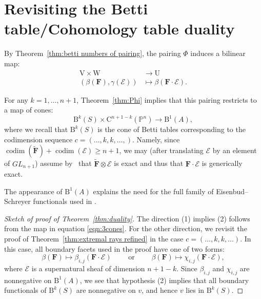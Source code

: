 \documentclass[12pt]{amsart}
\theoremstyle{definition}
\theoremstyle{remark}
\newcommand{\codim}{\operatorname{codim}}
\newcommand{\PP}{\mathbb{P}}
\newcommand{\UU}{\mathrm{U}}
\newcommand{\VV}{\mathrm{V}}
\newcommand{\WW}{\mathrm{W}}
\newcommand{\cc}{c}
\newcommand{\cE}{\mathcal{E}}
\newcommand{\FF}{\mathbf{F}}
\newcommand{\GL}{{GL}}
\newcommand{\CQ}{\mathrm{C}}
\newcommand{\BBQ}{\mathrm{B}}
\begin{document}
\section{Revisiting the Betti table/Cohomology table duality}\label{sec:duality}


By Theorem~\ref{thm:betti numbers of pairing}, the pairing $\Phi$ induces a bilinear map:
\begin{align*}
\VV\times \WW & \to \UU\\
(\beta(\FF),\gamma(\cE))&\mapsto \beta(\FF\cdot \cE).
\end{align*}


For any $k=1, \dots, n+1$, Theorem~\ref{thm:Phi}  implies that this pairing  restricts to a map of cones:
\begin{equation}\label{eqn:3cones}
\BBQ^{k}(S)\times \CQ^{n+1-k}(\PP^n)\to \BBQ^1(A),
\end{equation}
where we recall that $\BBQ^k(S)$ is the cone of Betti tables corresponding to the codimension sequence $\cc=(\dots,k,k,\dots,)$.
Namely, since $\codim(\widetilde{\FF})+\codim(\cE)\geq n+1$, we may (after translating $\cE$ by an element of $\GL_{n+1}$) assume by~\cite[Theorem, p. 335]{miller-speyer} that $\widetilde{\FF}\otimes \cE$ is exact and thus that $\FF\cdot \cE$ is generically exact.

The 
 appearance of $\BBQ^1(A)$ explains the need for the full family of Eisenbud--Schreyer functionals used in \cite{eis-schrey1}.
\begin{proof}[Sketch of proof of Theorem~\ref{thm:duality}]
The direction (1) implies (2) follows from the map in equation \eqref{eqn:3cones}. For the other direction, we revisit the proof of Theorem~\ref{thm:extremal rays refined} in the case $\cc=(\dots, k,k,\dots)$.  In this case, all boundary facets used in the proof have one of two forms:
\[
\beta(\FF)\mapsto\beta_{i,j}(\FF\cdot \cE) \qquad \text{ or } \qquad \beta(\FF)\mapsto\chi_{i,j}(\FF\cdot \cE),
\]
where $\cE$ is a supernatural sheaf of dimension $n+1-k$.  Since $\beta_{i,j}$ and $\chi_{i,j}$ are nonnegative on $\BBQ^1(A)$, we see that hypothesis (2) implies that all boundary functionals of $\BBQ^k(S)$ are nonnegative on $v$, and hence $v$ lies in $\BBQ^k(S)$.
\end{proof}
%
\end{document}
